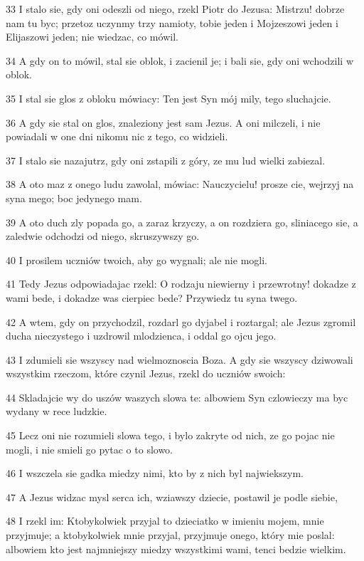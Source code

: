 \par 33 I stalo sie, gdy oni odeszli od niego, rzekl Piotr do Jezusa: Mistrzu! dobrze nam tu byc; przetoz uczynmy trzy namioty, tobie jeden i Mojzeszowi jeden i Elijaszowi jeden; nie wiedzac, co mówil.
\par 34 A gdy on to mówil, stal sie oblok, i zacienil je; i bali sie, gdy oni wchodzili w oblok.
\par 35 I stal sie glos z obloku mówiacy: Ten jest Syn mój mily, tego sluchajcie.
\par 36 A gdy sie stal on glos, znaleziony jest sam Jezus. A oni milczeli, i nie powiadali w one dni nikomu nic z tego, co widzieli.
\par 37 I stalo sie nazajutrz, gdy oni zstapili z góry, ze mu lud wielki zabiezal.
\par 38 A oto maz z onego ludu zawolal, mówiac: Nauczycielu! prosze cie, wejrzyj na syna mego; boc jedynego mam.
\par 39 A oto duch zly popada go, a zaraz krzyczy, a on rozdziera go, sliniacego sie, a zaledwie odchodzi od niego, skruszywszy go.
\par 40 I prosilem uczniów twoich, aby go wygnali; ale nie mogli.
\par 41 Tedy Jezus odpowiadajac rzekl: O rodzaju niewierny i przewrotny! dokadze z wami bede, i dokadze was cierpiec bede? Przywiedz tu syna twego.
\par 42 A wtem, gdy on przychodzil, rozdarl go dyjabel i roztargal; ale Jezus zgromil ducha nieczystego i uzdrowil mlodzienca, i oddal go ojcu jego.
\par 43 I zdumieli sie wszyscy nad wielmoznoscia Boza. A gdy sie wszyscy dziwowali wszystkim rzeczom, które czynil Jezus, rzekl do uczniów swoich:
\par 44 Skladajcie wy do uszów waszych slowa te: albowiem Syn czlowieczy ma byc wydany w rece ludzkie.
\par 45 Lecz oni nie rozumieli slowa tego, i bylo zakryte od nich, ze go pojac nie mogli, i nie smieli go pytac o to slowo.
\par 46 I wszczela sie gadka miedzy nimi, kto by z nich byl najwiekszym.
\par 47 A Jezus widzac mysl serca ich, wziawszy dziecie, postawil je podle siebie,
\par 48 I rzekl im: Ktobykolwiek przyjal to dzieciatko w imieniu mojem, mnie przyjmuje; a ktobykolwiek mnie przyjal, przyjmuje onego, który mie poslal: albowiem kto jest najmniejszy miedzy wszystkimi wami, tenci bedzie wielkim.
